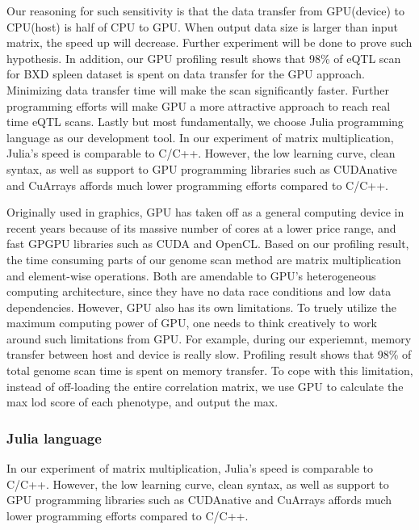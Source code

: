 \documentclass[9pt,twocolumn,twoside,lineno]{gsag3jnl}
\begin{document}
	Our reasoning for such sensitivity is that the data transfer from GPU(device) to CPU(host) is half of CPU to GPU. 
	When output data size is larger than input matrix, the speed up will decrease. 
	Further experiment will be done to prove such hypothesis. 
	In addition, our GPU profiling result shows that 98\% of eQTL scan for BXD spleen dataset is spent on data transfer for the GPU approach. 
	Minimizing data transfer time will make the scan significantly faster. 
	Further programming efforts will make GPU a more attractive approach to reach real time eQTL scans. 
	Lastly but most fundamentally, we choose Julia programming language as our development tool. 
	In our experiment of matrix multiplication, Julia's speed is comparable to C/C++. 
	However, the low learning curve, clean syntax, as well as support to GPU programming libraries such as CUDAnative and CuArrays affords much lower programming efforts compared to C/C++.
\fi

Originally used in graphics, GPU has taken off as a general computing device in recent years because of its massive number of cores at a lower price range, and fast GPGPU libraries such as CUDA and OpenCL.
Based on our profiling result, the time consuming parts of our genome scan method are matrix multiplication and element-wise operations. 
Both are amendable to GPU's heterogeneous computing architecture, since they have no data race conditions and low data dependencies. 
However, GPU also has its own limitations. 
To truely utilize the maximum computing power of GPU, one needs to think creatively to work around such limitations from GPU. 
For example, during our experiemnt, memory transfer between host and device is really slow. 
Profiling result shows that 98\% of total genome scan time is spent on memory transfer. 
To cope with this limitation, instead of off-loading the entire correlation matrix, we use GPU to calculate the max lod score of each phenotype, and output the max. 

\subsubsection{Julia language}
In our experiment of matrix multiplication, Julia's speed is comparable to C/C++. 
However, the low learning curve, clean syntax, as well as support to GPU programming libraries such as CUDAnative and CuArrays affords much lower programming efforts compared to C/C++.
\end{document}

